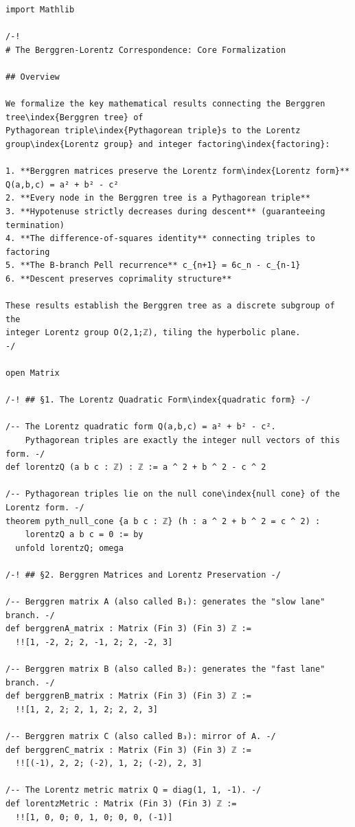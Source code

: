 \documentclass[11pt,openany]{book}
\theoremstyle{definition}
\theoremstyle{plain}
\theoremstyle{remark}
\begin{document}
\begin{lstlisting}[style=lean]
import Mathlib

/-!
# The Berggren-Lorentz Correspondence: Core Formalization

## Overview

We formalize the key mathematical results connecting the Berggren tree\index{Berggren tree} of
Pythagorean triple\index{Pythagorean triple}s to the Lorentz group\index{Lorentz group} and integer factoring\index{factoring}:

1. **Berggren matrices preserve the Lorentz form\index{Lorentz form}** Q(a,b,c) = a² + b² - c²
2. **Every node in the Berggren tree is a Pythagorean triple**
3. **Hypotenuse strictly decreases during descent** (guaranteeing termination)
4. **The difference-of-squares identity** connecting triples to factoring
5. **The B-branch Pell recurrence** c_{n+1} = 6c_n - c_{n-1}
6. **Descent preserves coprimality structure**

These results establish the Berggren tree as a discrete subgroup of the
integer Lorentz group O(2,1;ℤ), tiling the hyperbolic plane.
-/

open Matrix

/-! ## §1. The Lorentz Quadratic Form\index{quadratic form} -/

/-- The Lorentz quadratic form Q(a,b,c) = a² + b² - c².
    Pythagorean triples are exactly the integer null vectors of this form. -/
def lorentzQ (a b c : ℤ) : ℤ := a ^ 2 + b ^ 2 - c ^ 2

/-- Pythagorean triples lie on the null cone\index{null cone} of the Lorentz form. -/
theorem pyth_null_cone {a b c : ℤ} (h : a ^ 2 + b ^ 2 = c ^ 2) :
    lorentzQ a b c = 0 := by
  unfold lorentzQ; omega

/-! ## §2. Berggren Matrices and Lorentz Preservation -/

/-- Berggren matrix A (also called B₁): generates the "slow lane" branch. -/
def berggrenA_matrix : Matrix (Fin 3) (Fin 3) ℤ :=
  !![1, -2, 2; 2, -1, 2; 2, -2, 3]

/-- Berggren matrix B (also called B₂): generates the "fast lane" branch. -/
def berggrenB_matrix : Matrix (Fin 3) (Fin 3) ℤ :=
  !![1, 2, 2; 2, 1, 2; 2, 2, 3]

/-- Berggren matrix C (also called B₃): mirror of A. -/
def berggrenC_matrix : Matrix (Fin 3) (Fin 3) ℤ :=
  !![(-1), 2, 2; (-2), 1, 2; (-2), 2, 3]

/-- The Lorentz metric matrix Q = diag(1, 1, -1). -/
def lorentzMetric : Matrix (Fin 3) (Fin 3) ℤ :=
  !![1, 0, 0; 0, 1, 0; 0, 0, (-1)]


\end{lstlisting}
\end{document}
